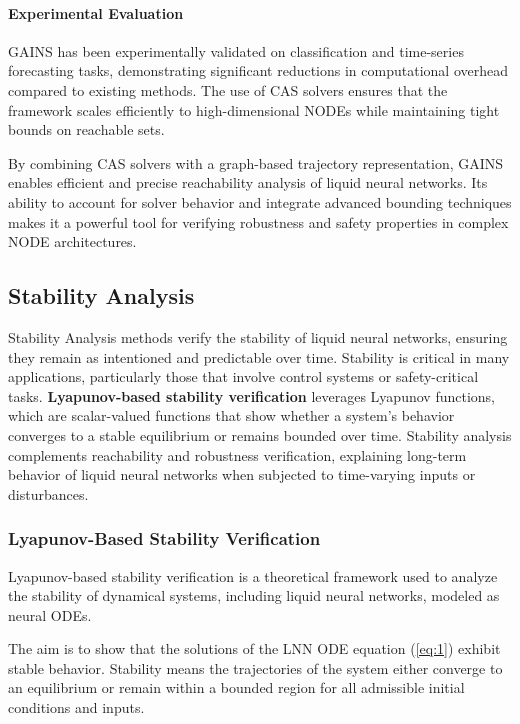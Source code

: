 \paragraph{Experimental Evaluation}
GAINS has been experimentally validated on classification and time-series forecasting tasks, demonstrating significant reductions in computational overhead compared to existing methods. The use of CAS solvers ensures that the framework scales efficiently to high-dimensional NODEs while maintaining tight bounds on reachable sets.

By combining CAS solvers with a graph-based trajectory representation, GAINS enables efficient and precise reachability analysis of liquid neural networks. Its ability to account for solver behavior and integrate advanced bounding techniques makes it a powerful tool for verifying robustness and safety properties in complex NODE architectures. \cite{zeqiriEfficientCertifiedTraining2023}

\subsection{Stability Analysis}

Stability Analysis methods verify the stability of liquid neural networks, ensuring they remain as intentioned and predictable over time. Stability is critical in many applications, particularly those that involve control systems or safety-critical tasks. \textbf{Lyapunov-based stability verification} leverages Lyapunov functions, which are scalar-valued functions that show whether a system's behavior converges to a stable equilibrium or remains bounded over time. Stability analysis complements reachability and robustness verification, explaining long-term behavior of liquid neural networks when subjected to time-varying inputs or disturbances.

\subsubsection{Lyapunov-Based Stability Verification}

Lyapunov-based stability verification is a theoretical framework used to analyze the stability of dynamical systems, including liquid neural networks, modeled as neural ODEs.

The aim is to show that the solutions of the LNN ODE equation (\ref{eq:1}) exhibit stable behavior. Stability means the trajectories of the system either converge to an equilibrium or remain within a bounded region for all admissible initial conditions and inputs.

